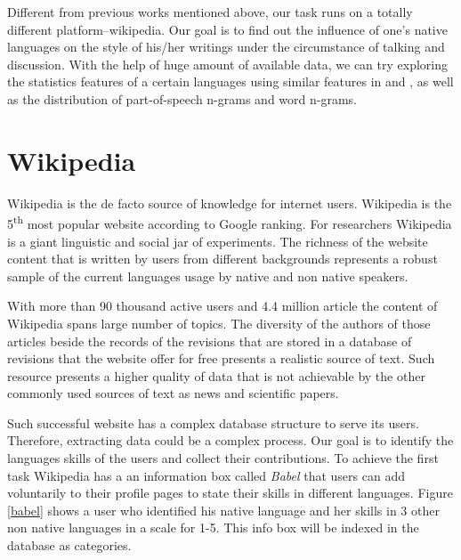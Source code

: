 \documentclass[11pt]{article}
\begin{document}
Different from previous works mentioned above, our task runs on a totally different platform--wikipedia. Our goal is to find out the influence of one's native languages on the style of his/her writings under the circumstance of talking and discussion. With the help of huge amount of available data, we can try exploring the statistics features of a certain languages using similar features in  and , as well as the distribution of part-of-speech n-grams and word n-grams.      

\section{Wikipedia}

Wikipedia is the de facto source of knowledge for internet users. Wikipedia is the 5\textsuperscript{th} most popular website according to Google ranking. For researchers Wikipedia is a giant linguistic and social jar of experiments. The richness of the website content that is written by users from different backgrounds represents a robust sample of the current languages usage by native and non native speakers.

With more than 90 thousand active users and 4.4 million article the content of Wikipedia spans large number of topics. The diversity of the authors of those articles beside the records of the revisions that are stored in a database of revisions that the website offer for free presents a realistic source of text. Such resource presents a higher quality of data that is not achievable by the other commonly used sources of text as news and scientific papers.

Such successful website has a complex database structure to serve its users. Therefore, extracting data could be a complex process. Our goal is to identify the languages skills of the users and collect their contributions. To achieve the first task Wikipedia has a an information box called \emph{Babel} that users can add voluntarily to their profile pages to state their skills in different languages. Figure \ref{babel} shows a user who identified his native language and her skills in 3 other non native languages in a scale for 1-5. This info box will be indexed in the database as categories.
\end{document}
